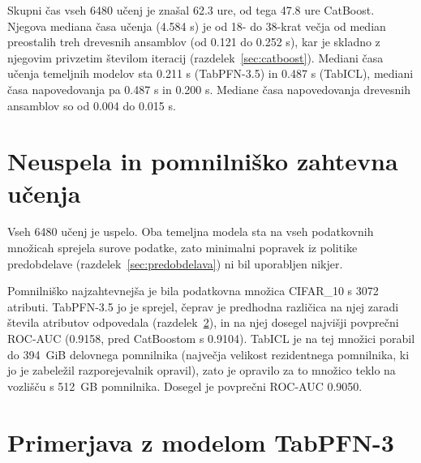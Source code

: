 \documentclass[a4paper,12pt,openright]{book}
\begin{document}
Skupni čas vseh 6480 učenj je znašal \num{62.3} ure, od tega \num{47.8} ure
CatBoost. Njegova mediana časa učenja (\num{4.584} s) je od 18- do 38-krat
večja od median preostalih treh drevesnih ansamblov (od \num{0.121} do
\num{0.252} s), kar je skladno z njegovim privzetim številom iteracij
(razdelek~\ref{sec:catboost}). Mediani časa učenja temeljnih modelov sta
\num{0.211} s (TabPFN-3.5) in \num{0.487} s (TabICL), mediani časa
napovedovanja pa \num{0.487} s in \num{0.200} s. Mediane časa napovedovanja
drevesnih ansamblov so od \num{0.004} do \num{0.015} s.



\section{Neuspela in pomnilniško zahtevna učenja}
\label{sec:rez-pomnilnik}

Vseh 6480 učenj je uspelo. Oba temeljna modela sta na vseh podatkovnih množicah
sprejela surove podatke, zato minimalni popravek iz politike predobdelave
(razdelek~\ref{sec:predobdelava}) ni bil uporabljen nikjer.

Pomnilniško najzahtevnejša je bila podatkovna množica CIFAR\_10 s 3072 atributi.
TabPFN-3.5 jo je sprejel, čeprav je predhodna različica na njej zaradi števila
atributov odpovedala (razdelek~\ref{sec:rez-zagona}), in na njej dosegel
najvišji povprečni ROC-AUC (\num{0.9158}, pred CatBoostom s \num{0.9104}).
TabICL je na tej množici porabil do 394~GiB delovnega pomnilnika (največja
velikost rezidentnega pomnilnika, ki jo je zabeležil razporejevalnik opravil),
zato je opravilo za to množico teklo na vozlišču s 512~GB pomnilnika. Dosegel
je povprečni ROC-AUC \num{0.9050}.

\section{Primerjava z modelom TabPFN-3}
\label{sec:rez-zagona}
\end{document}
